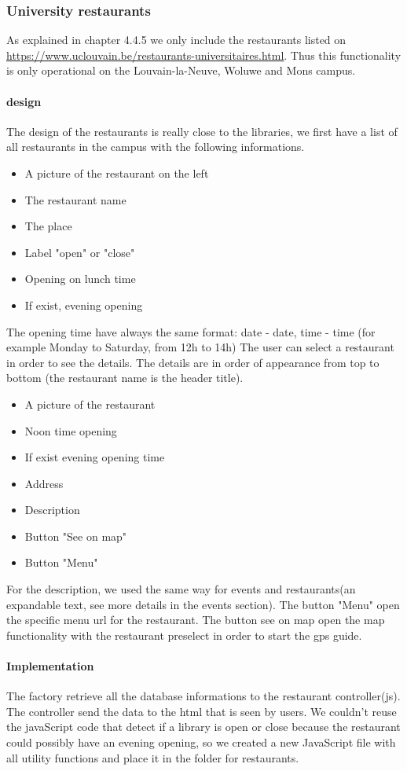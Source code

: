 \documentclass[11pt, a4paper]{report}
\begin{document}
\subsubsection{University restaurants}
As explained in chapter 4.4.5 we only include the restaurants listed on \url{https://www.uclouvain.be/restaurants-universitaires.html}. Thus this functionality is only operational on the Louvain-la-Neuve, Woluwe and Mons campus.
\paragraph{design}
The design of the restaurants is really close to the libraries, we first have a list of all restaurants in the campus with the following informations.
\begin{itemize}
\item A picture of the restaurant on the left
\item The restaurant name
\item The place
\item Label "open" or "close"
\item Opening on lunch time
\item If exist, evening opening
\end{itemize}
The opening time have always the same format: date - date, time - time (for example Monday to Saturday, from 12h to 14h)
The user can select a restaurant in order to see the details. The details are in order of appearance from top to bottom (the restaurant name is the header title). 
\begin{itemize}
\item A picture of the restaurant
\item Noon time opening 
\item If exist evening opening time 
\item Address
\item Description
\item Button "See on map"
\item Button "Menu"
\end{itemize}
For the description, we used the same way for events and restaurants(an expandable text, see more details in the events section). The button "Menu" open the specific menu url for the restaurant. The button see on map open the map functionality with the restaurant preselect in order to start the gps guide.
\paragraph{Implementation}
The factory retrieve all the database informations to the restaurant controller(js). The controller send the data to the html that is seen by users. We couldn't reuse the javaScript code that detect if a library is open or close because the restaurant could possibly have an evening opening, so we created a new JavaScript file with all utility functions and place it in the folder for restaurants. 
\end{document}
